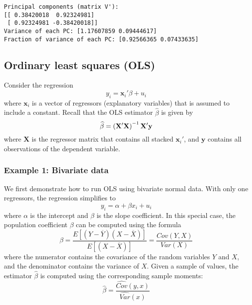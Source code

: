 \documentclass[10pt]{scrartcl}
\begin{document}
    \begin{Verbatim}[commandchars=\\\{\}]
Principal components (matrix V'):
[[ 0.38420018  0.92324981]
 [ 0.92324981 -0.38420018]]
Variance of each PC: [1.17607859 0.09444617]
Fraction of variance of each PC: [0.92566365 0.07433635]
    \end{Verbatim}


    \hypertarget{ordinary-least-squares-ols}{%
\subsection{Ordinary least squares
(OLS)}\label{ordinary-least-squares-ols}}

Consider the regression \[
y_i = \mathbf{x}_i' \beta + u_i
\] where \(\mathbf{x}_i\) is a vector of regressors (explanatory
variables) that is assumed to include a constant. Recall that the OLS
estimator \(\widehat{\beta}\) is given by \[
\def\bX{\mathbf{X}}
\def\bY{\mathbf{y}}
\widehat{\beta} = \left(\bX'\bX\right)^{-1}\bX'\bY
\] where \(\mathbf{X}\) is the regressor matrix that contains all
stacked \(\mathbf{x}_i'\), and \(\mathbf{y}\) contains all observations
of the dependent variable.

    \hypertarget{example-1-bivariate-data}{%
\subsubsection{Example 1: Bivariate
data}\label{example-1-bivariate-data}}

We first demonstrate how to run OLS using bivariate normal data. With
only one regressors, the regression simplifies to \[
y_i = \alpha + \beta x_i + u_i
\] where \(\alpha\) is the intercept and \(\beta\) is the slope
coefficient. In this special case, the population coefficient \(\beta\)
can be computed using the formula \[
\beta = \frac{E[(Y-\overline{Y})(X-\overline{X})]}{E[(X-\overline{X})]}
 = \frac{Cov(Y,X)}{Var(X)}
\] where the numerator contains the covariance of the random variables
\(Y\) and \(X\), and the denominator contains the variance of \(X\).
Given a sample of values, the estimator \(\widehat{\beta}\) is computed
using the corresponding sample moments: \[
\widehat{\beta} = \frac{\widehat{Cov}(y,x)}{\widehat{Var}(x)}
\]
\end{document}
